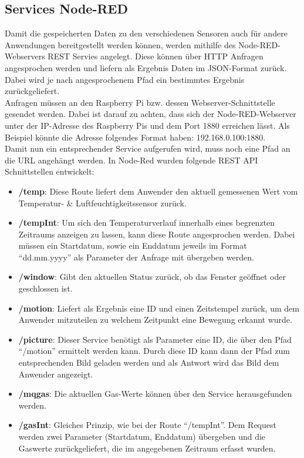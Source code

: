 \subsection{Services Node-RED}
Damit die gespeicherten Daten zu den verschiedenen Sensoren auch für andere Anwendungen bereitgestellt werden können, werden mithilfe des Node-RED-Webservers REST Servies angelegt. Diese können über \ac{HTTP} Anfragen angesprochen werden und liefern als Ergebnis Daten im \ac{JSON}-Format zurück. Dabei wird je nach angesprochenem Pfad ein bestimmtes Ergebnis zurückgeliefert. \\Anfragen müssen an den Raspberry Pi bzw. dessen Webserver-Schnittstelle gesendet werden. Dabei ist darauf zu achten, dass sich der Node-RED-Webserver unter der \ac{IP}-Adresse des Raspberry Pis und dem Port 1880 erreichen lässt. Als Beispiel könnte die Adresse folgendes Format haben: 192.168.0.100:1880. \\Damit nun ein entsprechender Service aufgerufen wird, muss noch eine Pfad an die \ac{URL} angehängt werden. In Node-Red wurden folgende REST \ac{API} Schnittstellen entwickelt:
\begin{itemize}
	\item \textbf{/temp}: Diese Route liefert dem Anwender den aktuell gemessenen Wert vom Temperatur- \& Luftfeuchtigkeitssensor  zurück. 
	\item \textbf{/tempInt}: Um sich den Temperaturverlauf innerhalb eines begrenzten Zeitraums anzeigen zu lassen, kann diese Route angesprochen werden. Dabei müssen ein Startdatum, sowie ein Enddatum jeweils im Format \enquote{dd.mm.yyyy} als Parameter der Anfrage mit übergeben werden.
	\item \textbf{/window}: Gibt den aktuellen Status zurück, ob das Fenster geöffnet oder geschlossen ist.
	\item \textbf{/motion}: Liefert als Ergebnis eine ID und einen Zeitstempel zurück, um dem Anwender mitzuteilen zu welchem Zeitpunkt eine Bewegung erkannt wurde.
	\item \textbf{/picture}: Dieser Service benötigt als Parameter eine ID, die über den Pfad \enquote{/motion} ermittelt werden kann. Durch diese ID kann dann der Pfad zum entsprechenden Bild geladen werden und als Antwort wird das Bild dem Anwender angezeigt.
	\item \textbf{/mqgas}: Die aktuellen Gas-Werte können über den Service herausgefunden werden.
	\item \textbf{/gasInt}: Gleiches Prinzip, wie bei der Route \enquote{/tempInt}. Dem Request werden zwei Parameter (Startdatum, Enddatum) übergeben und die Gaswerte zurückgeliefert, die im angegebenen Zeitraum erfasst wurden.
\end{itemize}

